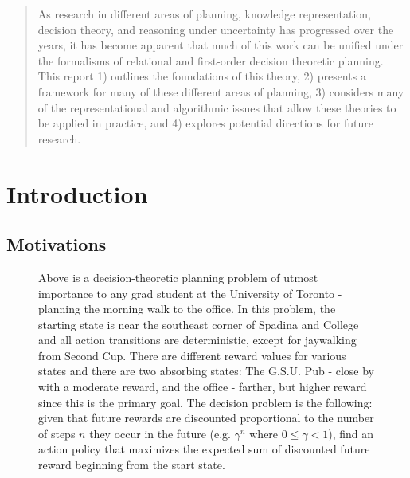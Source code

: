 \maketitle

\begin{abstract}
As research in different areas of planning, knowledge representation,
decision theory, and reasoning under uncertainty has progressed over
the years, it has become apparent that much of this work can be
unified under the formalisms of relational and first-order decision
theoretic planning.  This report 1) outlines the foundations of this
theory, 2) presents a framework for many of these different areas of
planning, 3) considers many of the representational and algorithmic issues
that allow these theories to be applied in practice, and 4)
explores potential directions for future research.
\end{abstract}

\newpage

\tableofcontents

\newpage


\section{Introduction}

\subsection{Motivations}

\begin{figure}[t!]

\begin{center}
\end{center}
\caption{Above is a decision-theoretic planning problem of utmost importance
to any grad student at the University of Toronto - planning the morning
walk to the office.  In this problem, the starting state is near the
southeast corner of Spadina and College and all action transitions are
deterministic, except for jaywalking from Second Cup.  There are
different reward values for various states and there are two absorbing
states: The G.S.U. Pub - close by with a moderate reward, and the
office - farther, but higher reward since this is the primary goal.
The decision problem is the following: given that future rewards are
discounted proportional to the number of steps $n$ they occur in the future
(e.g. $\gamma^n$ where $0 \leq \gamma < 1$), find an action policy
that maximizes the expected sum of discounted future
reward beginning from the start state.}
\label{intro}

\end{figure}

